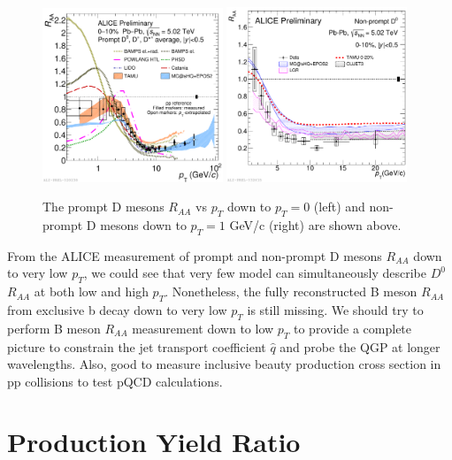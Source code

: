 \begin{figure}[hbtp]
\begin{center}
\includegraphics[width=0.48\textwidth]{Figures/Chapter2/ALICEDRAALow.pdf}
\includegraphics[width=0.48\textwidth]{Figures/Chapter2/ALICENPDRAALow.pdf}
\caption{The prompt D mesons $R_{AA}$ vs $p_T$ down to $p_T = 0$ (left) and non-prompt D mesons down to $p_T = 1$ GeV/c (right) are shown above.}
\label{ALICEDRAALow}
\end{center}
\end{figure}   

From the ALICE measurement of prompt and non-prompt D mesons $R_{AA}$ down to very low $p_T$, we could see that very few model can simultaneously describe $D^0$ $R_{AA}$ at both low and high $p_T$. Nonetheless, the fully reconstructed B meson $R_{AA}$ from exclusive b decay down to very low $p_T$ is still missing. We should try to perform B meson $R_{AA}$ measurement down to low $p_T$ to provide a complete picture to constrain the jet transport coefficient $\hat q$ and probe the QGP at longer wavelengths. Also, good to measure inclusive beauty production cross section in pp collisions to test pQCD calculations.  


\section{Production Yield Ratio}

